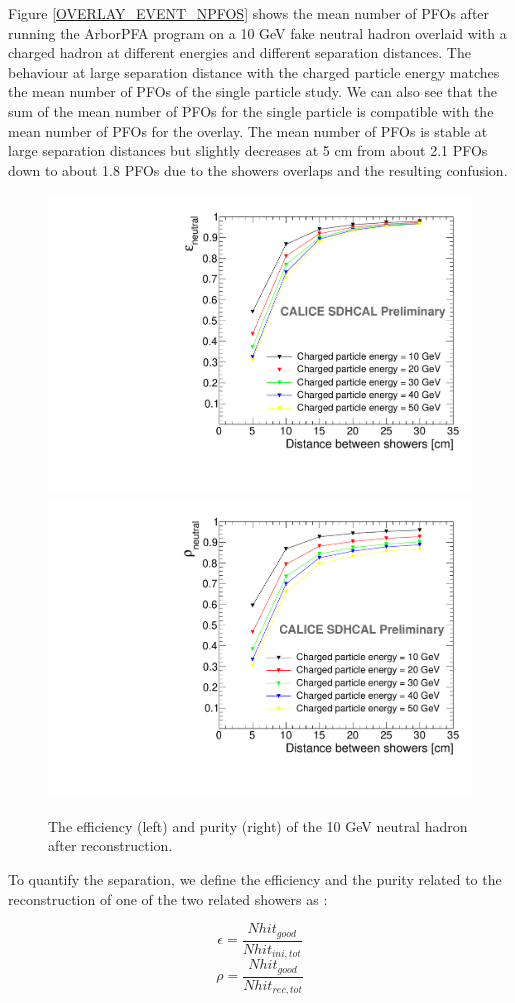 \documentclass[cits]{JINST}
\begin{document}
Figure \ref{OVERLAY_EVENT_NPFOS} shows the mean number of PFOs after running the ArborPFA program on a 10 GeV fake neutral hadron overlaid with a charged hadron at different energies and different separation distances. The behaviour at large separation distance with the charged particle energy matches the mean number of PFOs of the single particle study. We can also see that the sum of the mean number of PFOs for the single particle is compatible with the mean number of PFOs for the overlay. The mean number of PFOs is stable at large separation distances but slightly decreases at 5 cm from about 2.1 PFOs down to about 1.8 PFOs due to the showers overlaps and the resulting confusion.

\begin{figure}[!h]
  \begin{center}
    \includegraphics[width=0.47\linewidth]{plots/OverlayEvent_NeutralEfficiency.pdf}
    \includegraphics[width=0.47\linewidth]{plots/OverlayEvent_NeutralPurity.pdf}
  \end{center}
  \caption{\label{OVERLAY_EVENT_PURITY_EFFICIENCY} The efficiency (left) and purity (right) of the 10 GeV neutral hadron after reconstruction.}
\end{figure}


To quantify the separation, we define the efficiency and the purity related to the reconstruction of one of the two related showers as :

\begin{equation}
  \epsilon = \frac{Nhit_{good}}{Nhit_{ini,tot}}
\end{equation}
\begin{equation}
  \rho = \frac{Nhit_{good}}{Nhit_{rec,tot}}
\end{equation}
\end{document}
